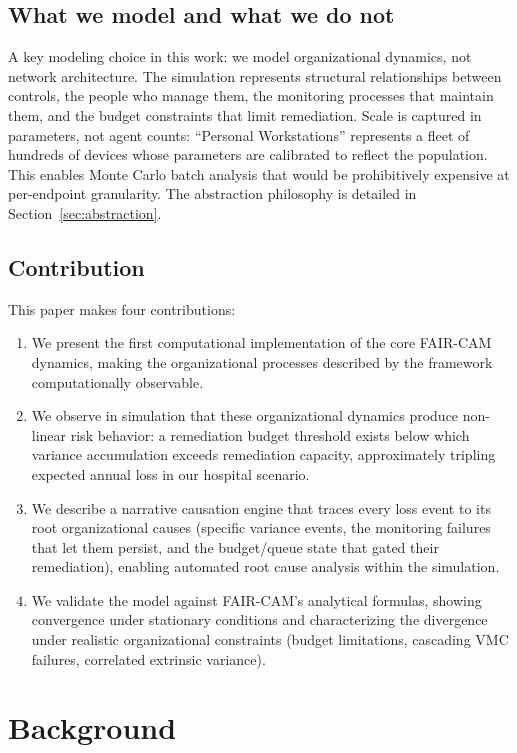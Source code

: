 \documentclass[11pt,a4paper]{article}
\begin{document}
\subsection{What we model and what we do not}

A key modeling choice in this work: we model organizational dynamics, not network architecture. The simulation represents structural relationships between controls, the people who manage them, the monitoring processes that maintain them, and the budget constraints that limit remediation. Scale is captured in parameters, not agent counts: ``Personal Workstations'' represents a fleet of hundreds of devices whose parameters are calibrated to reflect the population. This enables Monte Carlo batch analysis that would be prohibitively expensive at per-endpoint granularity. The abstraction philosophy is detailed in Section~\ref{sec:abstraction}.

\subsection{Contribution}

This paper makes four contributions:
\begin{enumerate}[nosep]
    \item We present the first computational implementation of the core FAIR-CAM dynamics, making the organizational processes described by the framework computationally observable.
    \item We observe in simulation that these organizational dynamics produce non-linear risk behavior: a remediation budget threshold exists below which variance accumulation exceeds remediation capacity, approximately tripling expected annual loss in our hospital scenario.
    \item We describe a narrative causation engine that traces every loss event to its root organizational causes (specific variance events, the monitoring failures that let them persist, and the budget/queue state that gated their remediation), enabling automated root cause analysis within the simulation.
    \item We validate the model against FAIR-CAM's analytical formulas, showing convergence under stationary conditions and characterizing the divergence under realistic organizational constraints (budget limitations, cascading VMC failures, correlated extrinsic variance).
\end{enumerate}


\section{Background}
\end{document}
